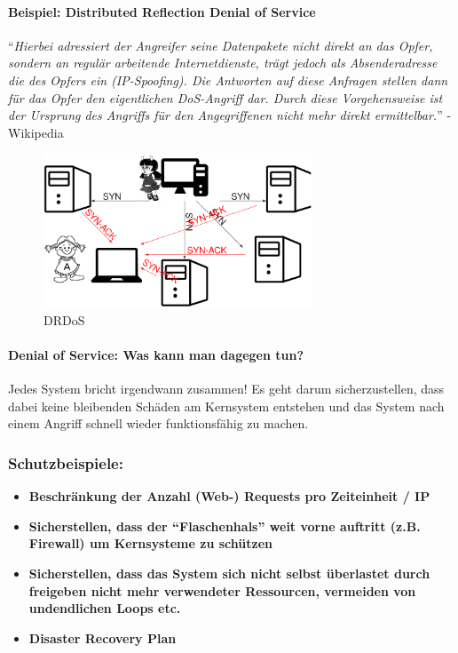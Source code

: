 \documentclass[10pt,a4paper]{article}
\begin{document}
\paragraph*{Beispiel: Distributed Reflection Denial of Service}
\noindent
"`\textsl{Hierbei adressiert der Angreifer seine Datenpakete nicht direkt an das Opfer, sondern an regulär arbeitende Internetdienste, trägt jedoch als Absenderadresse die des Opfers ein (IP-Spoofing). Die Antworten auf diese Anfragen stellen dann für das Opfer den eigentlichen DoS-Angriff dar. Durch diese Vorgehensweise ist der Ursprung des Angriffs für den Angegriffenen nicht mehr direkt ermittelbar.}"' - Wikipedia

\begin{figure}[H]
    \begin{center}
    \includegraphics[width=8cm]{images/DRDoS.png}
    \caption{DRDoS}
    \label{DRDoS}
    \end{center}
\end{figure}

\paragraph*{Denial of Service: Was kann man dagegen tun?} Jedes System bricht irgendwann zusammen! Es geht darum sicherzustellen, dass dabei keine bleibenden Schäden am
Kernsystem entstehen und das System nach einem Angriff schnell wieder funktionsfähig zu machen.

\subsubsection*{Schutzbeispiele:}
\begin{itemize}[noitemsep,topsep=0pt,leftmargin=*]
    \item \textbf{Beschränkung der Anzahl (Web-) Requests pro Zeiteinheit / IP }
    \item \textbf{Sicherstellen, dass der "`Flaschenhals"' weit vorne auftritt (z.B. Firewall) um Kernsysteme zu schützen}
    \item \textbf{Sicherstellen, dass das System sich nicht selbst überlastet durch freigeben nicht mehr verwendeter Ressourcen, vermeiden von undendlichen Loops etc.}
    \item \textbf{Disaster Recovery Plan}
\end{itemize}
\end{document}
